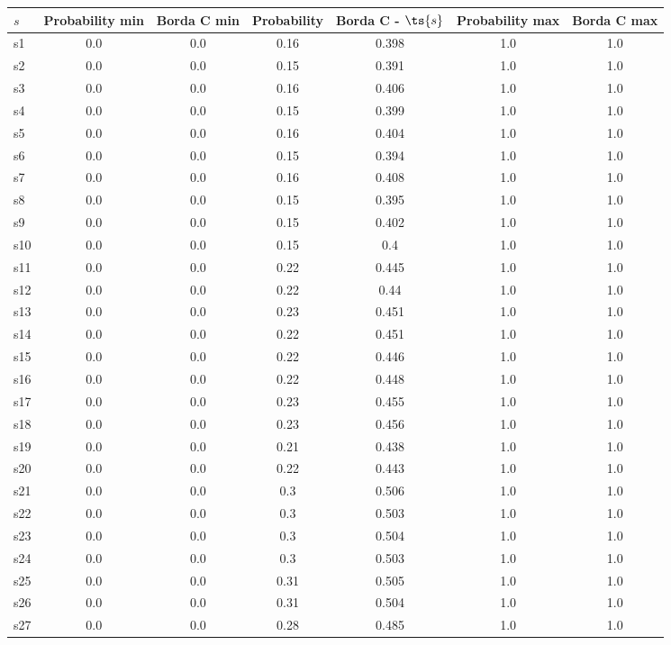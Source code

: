 \documentclass{article}
\begin{document}
\noindent\begin{tabular}{|l|c|c|c|c|c|c|}
\hline
$s$& Probability min & Borda C min & Probability & Borda C - $\ts{s}$ & Probability max & Borda C max\\
\hline
s1 &0.0 & 0.0 & 0.16 & 0.398 & 1.0 & 1.0\\
\hline
s2 &0.0 & 0.0 & 0.15 & 0.391 & 1.0 & 1.0\\
\hline
s3 &0.0 & 0.0 & 0.16 & 0.406 & 1.0 & 1.0\\
\hline
s4 &0.0 & 0.0 & 0.15 & 0.399 & 1.0 & 1.0\\
\hline
s5 &0.0 & 0.0 & 0.16 & 0.404 & 1.0 & 1.0\\
\hline
s6 &0.0 & 0.0 & 0.15 & 0.394 & 1.0 & 1.0\\
\hline
s7 &0.0 & 0.0 & 0.16 & 0.408 & 1.0 & 1.0\\
\hline
s8 &0.0 & 0.0 & 0.15 & 0.395 & 1.0 & 1.0\\
\hline
s9 &0.0 & 0.0 & 0.15 & 0.402 & 1.0 & 1.0\\
\hline
s10 &0.0 & 0.0 & 0.15 & 0.4 & 1.0 & 1.0\\
\hline
s11 &0.0 & 0.0 & 0.22 & 0.445 & 1.0 & 1.0\\
\hline
s12 &0.0 & 0.0 & 0.22 & 0.44 & 1.0 & 1.0\\
\hline
s13 &0.0 & 0.0 & 0.23 & 0.451 & 1.0 & 1.0\\
\hline
s14 &0.0 & 0.0 & 0.22 & 0.451 & 1.0 & 1.0\\
\hline
s15 &0.0 & 0.0 & 0.22 & 0.446 & 1.0 & 1.0\\
\hline
s16 &0.0 & 0.0 & 0.22 & 0.448 & 1.0 & 1.0\\
\hline
s17 &0.0 & 0.0 & 0.23 & 0.455 & 1.0 & 1.0\\
\hline
s18 &0.0 & 0.0 & 0.23 & 0.456 & 1.0 & 1.0\\
\hline
s19 &0.0 & 0.0 & 0.21 & 0.438 & 1.0 & 1.0\\
\hline
s20 &0.0 & 0.0 & 0.22 & 0.443 & 1.0 & 1.0\\
\hline
s21 &0.0 & 0.0 & 0.3 & 0.506 & 1.0 & 1.0\\
\hline
s22 &0.0 & 0.0 & 0.3 & 0.503 & 1.0 & 1.0\\
\hline
s23 &0.0 & 0.0 & 0.3 & 0.504 & 1.0 & 1.0\\
\hline
s24 &0.0 & 0.0 & 0.3 & 0.503 & 1.0 & 1.0\\
\hline
s25 &0.0 & 0.0 & 0.31 & 0.505 & 1.0 & 1.0\\
\hline
s26 &0.0 & 0.0 & 0.31 & 0.504 & 1.0 & 1.0\\
\hline
s27 &0.0 & 0.0 & 0.28 & 0.485 & 1.0 & 1.0\\

\end{tabular}
\end{document}
